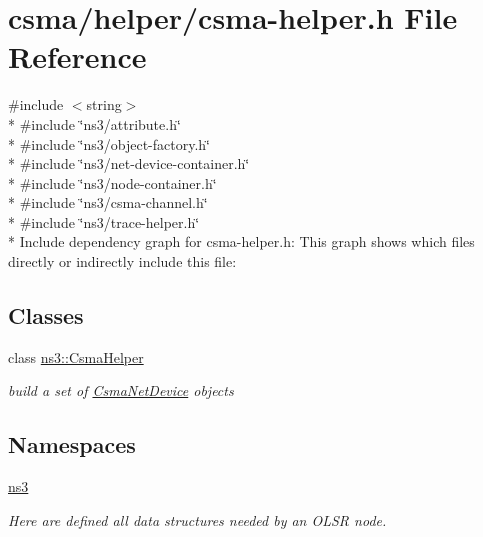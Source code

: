 \hypertarget{csma-helper_8h}{}\section{csma/helper/csma-\/helper.h File Reference}
\label{csma-helper_8h}
{\ttfamily \#include $<$string$>$}\\*
{\ttfamily \#include \char`\"{}ns3/attribute.\+h\char`\"{}}\\*
{\ttfamily \#include \char`\"{}ns3/object-\/factory.\+h\char`\"{}}\\*
{\ttfamily \#include \char`\"{}ns3/net-\/device-\/container.\+h\char`\"{}}\\*
{\ttfamily \#include \char`\"{}ns3/node-\/container.\+h\char`\"{}}\\*
{\ttfamily \#include \char`\"{}ns3/csma-\/channel.\+h\char`\"{}}\\*
{\ttfamily \#include \char`\"{}ns3/trace-\/helper.\+h\char`\"{}}\\*
Include dependency graph for csma-\/helper.h\+:
This graph shows which files directly or indirectly include this file\+:
\subsection*{Classes}
\begin{DoxyCompactItemize}
\item 
class \hyperlink{classns3_1_1CsmaHelper}{ns3\+::\+Csma\+Helper}
\begin{DoxyCompactList}\small\item\em build a set of \hyperlink{classns3_1_1CsmaNetDevice}{Csma\+Net\+Device} objects \end{DoxyCompactList}\end{DoxyCompactItemize}
\subsection*{Namespaces}
\begin{DoxyCompactItemize}
\item 
 \hyperlink{namespacens3}{ns3}
\begin{DoxyCompactList}\small\item\em Here are defined all data structures needed by an O\+L\+SR node. \end{DoxyCompactList}\end{DoxyCompactItemize}
